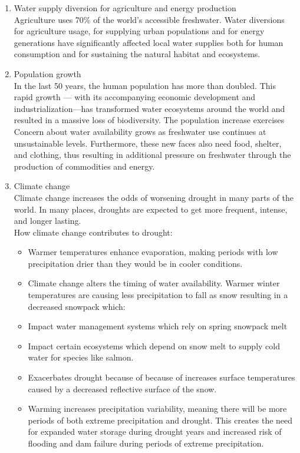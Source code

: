 \begin{itemize}
\begin{enumerate}
\item Water supply diversion for agriculture and energy production\\
Agriculture uses 70\% of the world’s accessible freshwater.  Water diversions for agriculture usage, for supplying urban populations and for energy generations have significantly affected local water supplies both for human consumption and for sustaining the natural habitat and ecosystems.

\item Population growth\\
In the last 50 years, the human population has more than doubled. This rapid growth — with its accompanying economic development and industrialization—has transformed water ecosystems around the world and resulted in a massive loss of biodiversity.
\vspace{0.2cm}
The population increase exercises Concern about water availability grows as freshwater use continues at unsustainable levels. Furthermore, these new faces also need food, shelter, and clothing, thus resulting in additional pressure on freshwater through the production of commodities and energy.\\

\item Climate change\\
Climate change increases the odds of worsening drought in many parts of the world. In many places, droughts are expected to get more frequent, intense, and longer lasting.\\

How climate change contributes to drought:\\

\begin{itemize}
\item Warmer temperatures enhance evaporation, making periods with low precipitation drier than they would be in cooler conditions.
\item Climate change alters the timing of water availability. Warmer winter temperatures are causing less precipitation to fall as snow resulting in a decreased snowpack which:
\item Impact water management systems which rely on spring snowpack melt
\item Impact certain ecosystems which depend on snow melt to supply cold water for species like salmon. 
\item Exacerbates drought because of because of increases surface temperatures caused by a decreased reflective surface of the snow.
\item Warming increases precipitation variability, meaning there will be more periods of both extreme precipitation and drought. This creates the need for expanded water storage during drought years and increased risk of flooding and dam failure during periods of extreme precipitation.\\
\end{itemize}
\end{enumerate}



\end{itemize}
